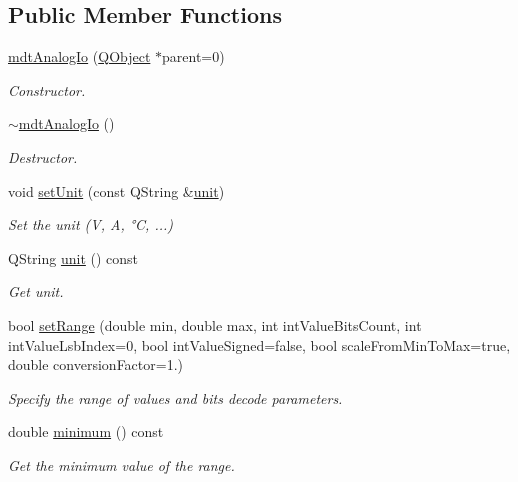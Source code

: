 \subsection*{Public Member Functions}
\begin{DoxyCompactItemize}
\item 
\hyperlink{classmdt_analog_io_affcdf039a10023b495cf49a5f476f829}{mdt\-Analog\-Io} (\hyperlink{class_q_object}{Q\-Object} $\ast$parent=0)
\begin{DoxyCompactList}\small\item\em Constructor. \end{DoxyCompactList}\item 
\hyperlink{classmdt_analog_io_a7ec3c075b1d49c2d0917c09e4950b856}{$\sim$mdt\-Analog\-Io} ()
\begin{DoxyCompactList}\small\item\em Destructor. \end{DoxyCompactList}\item 
void \hyperlink{classmdt_analog_io_afb4cd82bee1ac1e77148c8621b1c66fa}{set\-Unit} (const Q\-String \&\hyperlink{classmdt_analog_io_a126d5b9bf4a0bb9ce9f2ff6a010fef0e}{unit})
\begin{DoxyCompactList}\small\item\em Set the unit (V, A, °\-C, ...) \end{DoxyCompactList}\item 
Q\-String \hyperlink{classmdt_analog_io_a126d5b9bf4a0bb9ce9f2ff6a010fef0e}{unit} () const 
\begin{DoxyCompactList}\small\item\em Get unit. \end{DoxyCompactList}\item 
bool \hyperlink{classmdt_analog_io_a026624e890e4f2084c88377a6e4f1b47}{set\-Range} (double min, double max, int int\-Value\-Bits\-Count, int int\-Value\-Lsb\-Index=0, bool int\-Value\-Signed=false, bool scale\-From\-Min\-To\-Max=true, double conversion\-Factor=1.)
\begin{DoxyCompactList}\small\item\em Specify the range of values and bits decode parameters. \end{DoxyCompactList}\item 
double \hyperlink{classmdt_analog_io_acd2b8cb33d5d42abf23672ad7675825e}{minimum} () const 
\begin{DoxyCompactList}\small\item\em Get the minimum value of the range. \end{DoxyCompactList}\item 

\end{DoxyCompactItemize}
